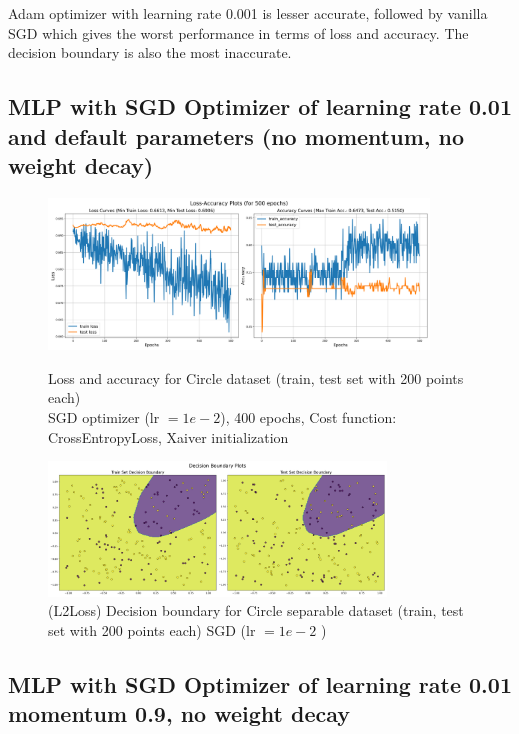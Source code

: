 \begin{solve}
Adam optimizer with learning rate 0.001 is lesser accurate, followed by vanilla SGD which gives the worst performance in terms of loss and accuracy. The decision boundary is also the most inaccurate.

\subsection{MLP with SGD Optimizer of learning rate 0.01 and default parameters (no momentum, no weight decay)}

\begin{figure}[H]
    \centering
    \includegraphics[width=0.9\textwidth]{plots/5_sinusoid_sgd_morelayers_loss_acc.png}
    \caption{Loss and accuracy for Circle dataset (train, test set with 200 points each)\\ SGD optimizer (lr $=1e-2$), 400 epochs, Cost function: CrossEntropyLoss, Xaiver initialization}
    \includegraphics[width=0.8\textwidth]{plots/5_sinusoid_sgd_morelayers_boundary.png}
    \caption{(L2Loss) Decision boundary for Circle separable dataset (train, test set with 200 points each) 
    SGD (lr $=1e-2$ )}
\end{figure}

\subsection{MLP with SGD Optimizer of learning rate 0.01 momentum 0.9, no weight decay}


\end{solve}
